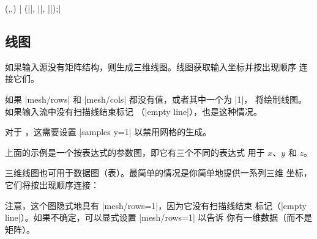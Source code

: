 {\begin{addplot3operation}[]{(,,)}{}
    | (||, ||, ||);|
\end{addplot3operation}


\subsection{线图}
\label{sec:pgfplots:lineplots}

如果输入源没有矩阵结构，则生成三维线图。线图获取输入坐标并按出现顺序
连接它们。

\begin{codeexample}[]
\end{codeexample}
%
如果 |mesh/rows| 和 |mesh/cols| 都没有值，或者其中一个为 |1|，
\PGFPlots{} 将绘制线图。如果输入流中没有扫描线结束标记
（|empty line|），也是这种情况。

对于 ，这需要设置 |samples y=1|
以禁用网格的生成。
%
\begin{codeexample}[]
\end{codeexample}
%
\noindent 上面的示例是一个按表达式的参数图，即它有三个不同的表达式
用于 $x$、$y$ 和 $z$。

三维线图也可用于数据图（表）。最简单的情况是你简单地提供一系列三维
坐标，它们将按出现顺序连接：
%
\begin{codeexample}[]
\end{codeexample}
%
\noindent 注意，这个图隐式地具有 |mesh/rows=1|，因为它没有扫描线结束
标记（|empty line|）。如果不确定，可以显式设置 |mesh/rows=1| 以告诉
\PGFPlots{} 你有一维数据（而不是矩阵）。

}
